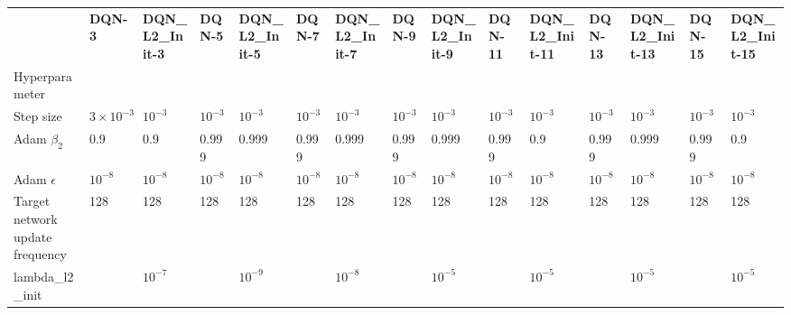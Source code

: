 \begin{tabular}{lllllllllllllll}
 & \bfseries DQN-3 & \bfseries DQN_L2_Init-3 & \bfseries DQN-5 & \bfseries DQN_L2_Init-5 & \bfseries DQN-7 & \bfseries DQN_L2_Init-7 & \bfseries DQN-9 & \bfseries DQN_L2_Init-9 & \bfseries DQN-11 & \bfseries DQN_L2_Init-11 & \bfseries DQN-13 & \bfseries DQN_L2_Init-13 & \bfseries DQN-15 & \bfseries DQN_L2_Init-15 \\
Hyperparameter &  &  &  &  &  &  &  &  &  &  &  &  &  &  \\
Step size & $3 \times 10^{-3}$ & $10^{-3}$ & $10^{-3}$ & $10^{-3}$ & $10^{-3}$ & $10^{-3}$ & $10^{-3}$ & $10^{-3}$ & $10^{-3}$ & $10^{-3}$ & $10^{-3}$ & $10^{-3}$ & $10^{-3}$ & $10^{-3}$ \\
Adam $\beta_2$ & 0.9 & 0.9 & 0.999 & 0.999 & 0.999 & 0.999 & 0.999 & 0.999 & 0.999 & 0.9 & 0.999 & 0.999 & 0.999 & 0.9 \\
Adam $\epsilon$ & $10^{-8}$ & $10^{-8}$ & $10^{-8}$ & $10^{-8}$ & $10^{-8}$ & $10^{-8}$ & $10^{-8}$ & $10^{-8}$ & $10^{-8}$ & $10^{-8}$ & $10^{-8}$ & $10^{-8}$ & $10^{-8}$ & $10^{-8}$ \\
Target network update frequency & 128 & 128 & 128 & 128 & 128 & 128 & 128 & 128 & 128 & 128 & 128 & 128 & 128 & 128 \\
lambda_l2_init &  & $10^{-7}$ &  & $10^{-9}$ &  & $10^{-8}$ &  & $10^{-5}$ &  & $10^{-5}$ &  & $10^{-5}$ &  & $10^{-5}$ \\
\end{tabular}
